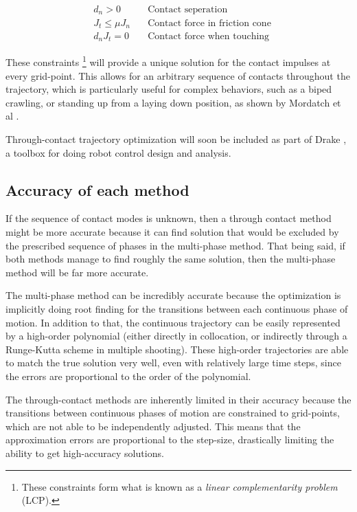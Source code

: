 \begin{align*}
	&d_n > 0            \quad &\text{Contact seperation} \\
	&J_t \leq \mu J_n  \quad &\text{Contact force in friction cone} \\
	&d_n J_t = 0 \quad &\text{Contact force when touching}
\end{align*}

These constraints \footnote{These constraints form what is known as a {\em linear complementarity problem} (LCP).} will provide a unique solution for the contact impulses at every grid-point. This allows for an arbitrary sequence of contacts throughout the trajectory, which is particularly useful for complex behaviors, such as a biped crawling, or standing up from a laying down position, as shown by Mordatch et al \cite{Mordatch2012}.

\par Through-contact trajectory optimization will soon be included as part of Drake \cite{Tedrake2014}, a toolbox for doing robot control design and analysis. 

\subsection{Accuracy of each method}
\par If the sequence of contact modes is unknown, then a through contact method might be more accurate because it can find solution that would be excluded by the prescribed sequence of phases in the multi-phase method. That being said, if both methods manage to find roughly the same solution, then the multi-phase method will be far more accurate.

\par The multi-phase method can be incredibly accurate because the optimization is implicitly doing root finding for the transitions between each continuous phase of motion. In addition to that, the continuous trajectory can be easily represented by a high-order polynomial (either directly in collocation, or indirectly through a Runge-Kutta scheme in multiple shooting). These high-order trajectories are able to match the true solution very well, even with relatively large time steps, since the errors are proportional to the order of the polynomial.

\par The through-contact methods are inherently limited in their accuracy because the transitions between continuous phases of motion are constrained to grid-points, which are not able to be independently adjusted. This means that the approximation errors are proportional to the step-size, drastically limiting the ability to get high-accuracy solutions.



